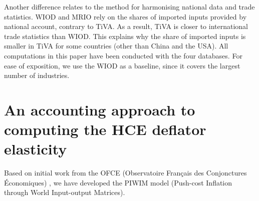 \documentclass[11pt,a4paper]{paper} %
\begin{document}
Another difference relates to the method for harmonising national data and trade statistics. WIOD and MRIO rely on the shares of imported inputs provided by national account, contrary to TiVA. As a result, TiVA is closer to international trade statistics than WIOD. This explains why the share of imported inputs is smaller in TiVA for some countries (other than China and the USA).
All computations in this paper have been conducted with the four databases.
For ease of exposition, we use the WIOD as a baseline, since it covers the largest number of industries.

\section{An accounting approach to computing the HCE deflator elasticity}
\label{sec:metho}

Based on initial work from the OFCE (Observatoire Français des Conjonctures Économiques) \cite{Cochard2016}, we have developed the PIWIM model (Push-cost Inflation through World Input-output Matrices). 
\end{document}
